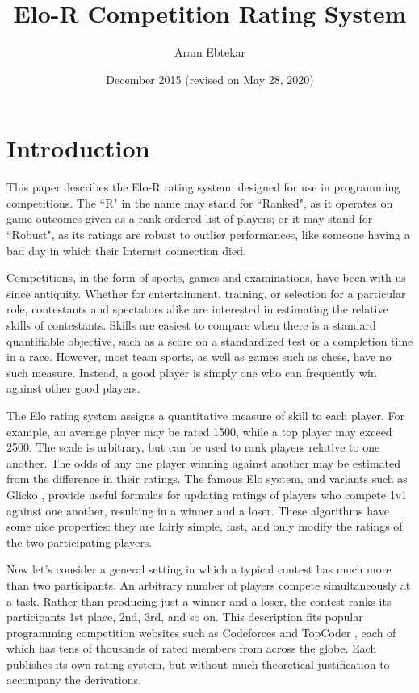 \documentclass{article}
\title{Elo-R Competition Rating System}
\author{Aram Ebtekar}
\date{December 2015 (revised on May 28, 2020)}
\begin{document}
\maketitle

\section{Introduction}

This paper describes the Elo-R rating system, designed for use in programming competitions. The ``R" in the name may stand for ``Ranked", as it operates on game outcomes given as a rank-ordered list of players; or it may stand for ``Robust", as its ratings are robust to outlier performances, like someone having a bad day in which their Internet connection died.

Competitions, in the form of sports, games and examinations, have been with us since antiquity. Whether for entertainment, training, or selection for a particular role, contestants and spectators alike are interested in estimating the relative skills of contestants. Skills are easiest to compare when there is a standard quantifiable objective, such as a score on a standardized test or a completion time in a race.  However, most team sports, as well as games such as chess, have no such measure. Instead, a good player is simply one who can frequently win against other good players.

The Elo rating system assigns a quantitative measure of skill to each player. For example, an average player may be rated 1500, while a top player may exceed 2500. The scale is arbitrary, but can be used to rank players relative to one another. The odds of any one player winning against another may be estimated from the difference in their ratings. The famous Elo system, and variants such as Glicko \cite{glicko}, provide useful formulas for updating ratings of players who compete 1v1 against one another, resulting in a winner and a loser. These algorithms have some nice properties: they are fairly simple, fast, and only modify the ratings of the two participating players.

Now let's consider a general setting in which a typical contest has much more than two participants. An arbitrary number of players compete simultaneously at a task. Rather than producing just a winner and a loser, the contest ranks its participants 1st place, 2nd, 3rd, and so on. This description fits popular programming competition websites such as Codeforces \cite{Codeforces} and TopCoder \cite{TopCoder}, each of which has tens of thousands of rated members from across the globe. Each publishes its own rating system, but without much theoretical justification to accompany the derivations.
\end{document}

